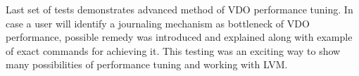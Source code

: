 \documentclass[
  color, %
  table, %
  lof,   %
  lot,   %
]{fithesis3}
\begin{document}
Last set of tests demonstrates advanced method of VDO performance tuning. In case a user will identify a journaling mechanism as bottleneck of VDO performance, possible remedy was introduced and explained along with example of exact commands for achieving it. This testing was an exciting way to show many possibilities of performance tuning and working with LVM.













\end{document}
